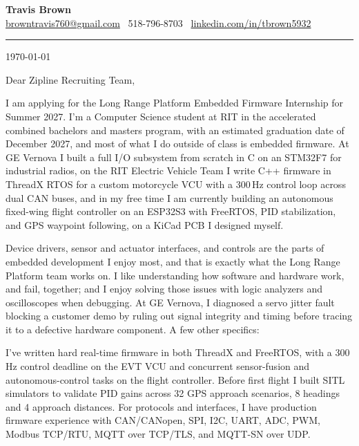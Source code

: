 \documentclass[11pt]{article}
\begin{document}
\begin{center}
  {\LARGE\textbf{Travis Brown}}\\[3pt]
  \href{mailto:browntravis760@gmail.com}{browntravis760@gmail.com} \textbullet\
  518-796-8703 \textbullet\
  \href{https://www.linkedin.com/in/tbrown5932}{linkedin.com/in/tbrown5932}
\end{center}

\vspace{2pt}
\noindent\rule{\linewidth}{0.5pt}
\vspace{10pt}

\begin{flushright}
  \today
\end{flushright}

\vspace{4pt}

Dear Zipline Recruiting Team,

I am applying for the Long Range Platform Embedded Firmware Internship for Summer 2027.
I'm a Computer Science student at RIT in the accelerated combined bachelors and masters
program, with an estimated graduation date of December 2027, and most of
what I do outside of class is embedded firmware. At GE Vernova I built a full I/O subsystem
from scratch in C on an STM32F7 for industrial radios, on the RIT Electric Vehicle Team I
write C++ firmware in ThreadX RTOS for a custom motorcycle VCU with a 300\,Hz control
loop across dual CAN buses, and in my free time I am currently building an autonomous fixed-wing flight
controller on an ESP32S3 with FreeRTOS, PID stabilization, and GPS waypoint following,
on a KiCad PCB I designed myself.

Device drivers, sensor and actuator interfaces, and controls are the parts of embedded
development I enjoy most, and that is exactly what the Long Range Platform team works on. I like understanding how software and hardware work, and fail, together; and I enjoy solving those issues with logic analyzers and oscilloscopes when debugging. 
At GE Vernova, I diagnosed a servo jitter fault blocking a customer demo by ruling out signal integrity and timing before tracing it to a defective hardware component. A few other specifics:

I've written hard real-time firmware in both ThreadX and FreeRTOS, with a 300\,Hz control
deadline on the EVT VCU and concurrent sensor-fusion and autonomous-control tasks on the
flight controller. Before first flight I built SITL simulators to validate PID gains across
32 GPS approach scenarios, 8 headings and 4 approach distances. For protocols and interfaces, I have production firmware experience with CAN/CANopen,
SPI, I2C, UART, ADC, PWM, Modbus TCP/RTU, MQTT over TCP/TLS, and MQTT-SN over UDP.
\end{document}
